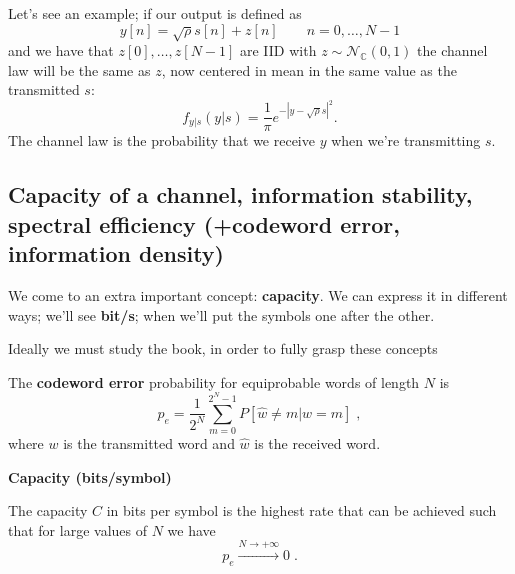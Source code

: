 \documentclass[a4paper, 11pt]{book}
\begin{document}
Let's see an example; if our output is defined as
\begin{equation}
y[n] = \sqrt{\rho}s[n] + z[n] \qquad n=0, \ldots, N-1 \tag{1.96}
\end{equation}
and we have that $z[0], \ldots, z[N-1]$ are IID with $z \sim \mathcal{N}_{\mathbb{C}}(0,1)$ the channel law will be the same as $z$, now centered in mean in the same value as the transmitted $s$:
\begin{equation}
f_{y|s}(y|s) = \frac{1}{\pi} e^{-|y-\sqrt{\rho}s|^2} \text{.} \tag{1.97}
\end{equation}
The channel law is the probability that we receive $y$ when we're transmitting $s$.

\subsection{Capacity of a channel, information stability, spectral efficiency (+codeword error, information density)}

We come to an extra important concept: \textbf{capacity}.
We can express it in different ways; we'll see \textbf{bit/s}; when we'll put the symbols one after the other.
\begin{tcolorbox}[frame empty, sharp corners, boxrule=0pt, leftrule=2pt, colframe=green!60!black, colback=green!5, left=5pt, top=3pt, bottom=3pt]
Ideally we must study the book, in order to fully grasp these concepts
\end{tcolorbox}

\vspace{0.5em}

The \textbf{codeword error} probability for equiprobable words of length $N$ is
$$
p_e = \frac{1}{2^N} \sum_{m=0}^{2^N-1} P[\hat{w} \neq m | w=m] \;,
$$
where $w$ is the transmitted word and $\hat{w}$ is the received word.

\begin{tcolorbox}[colframe=cyan!80!blue, colback=white, boxrule=1pt, arc=2pt]
    \textcolor{cyan!80!blue}{\textbf{ Capacity (bits/symbol)}}

    The capacity $C$ in bits per symbol is the highest rate that can be achieved such that for large values of $N$ we have
    $$
    p_e \stackrel{N \to +\infty}{\to} 0 \;.
    $$
\end{tcolorbox}

\vspace{1em}
\end{document}
